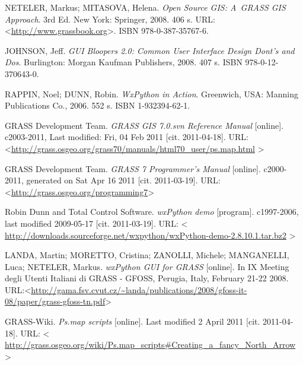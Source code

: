 \documentclass[a4paper,12pt,draft]{article}
\begin{document}
\begin{thebibliography}{99}
\label{literatura}


NETELER, Markus; MITASOVA, Helena. \textit{Open Source GIS:
A~GRASS GIS Approach}. 3rd Ed. New York: Springer, 2008. 406 s. URL:
\textless\url{http://www.grassbook.org}\textgreater. ISBN 978-0-387-35767-6.


JOHNSON, Jeff. \textit{GUI Bloopers 2.0: Common User Interface Design
Dont's and Dos}. Burlington: Morgan Kaufman Publishers, 2008. 407 s. ISBN
978-0-12-370643-0.


RAPPIN, Noel; DUNN, Robin. \emph{WxPython in Action}. Greenwich, USA: Manning
Publications Co., 2006. 552 s. ISBN 1-932394-62-1.


GRASS Development Team. \textit{GRASS GIS 7.0.svn Reference
Manual} [online]. c2003-2011, Last modified: Fri, 04 Feb 2011 [cit.
2011-04-18]. URL:
\textless\url{http://grass.osgeo.org/grass70/manuals/html70_user/ps.map.html}%
\textgreater


GRASS Development Team. \textit{GRASS 7 Programmer's Manual} [online].
c2000-2011, generated on Sat Apr 16 2011 [cit. 2011-03-19].
URL: \textless\url{http://grass.osgeo.org/programming7}\textgreater

Robin Dunn and Total Control Software. \textit{wxPython
demo} [program]. c1997-2006, last modified 2009-05-17 [cit. 2011-03-19]. URL:
\textless
\url{http://downloads.sourceforge.net/wxpython/wxPython-demo-2.8.10.1.tar.bz2}%
\textgreater


LANDA, Martin; MORETTO, Cristina; ZANOLLI, Michele; MANGANELLI, Luca; NETELER, Markus.
\textit{wxPython GUI for GRASS} [online]. In IX Meeting degli Utenti Italiani di GRASS - GFOSS, Perugia, Italy, February 21-22 2008.
URL:\textless\url{http://gama.fsv.cvut.cz/~landa/publications/2008/gfoss-it-08/paper/grass-gfoss-tn.pdf}\textgreater




GRASS-Wiki. \textit{Ps.map scripts} [online]. Last modified
2 April 2011 [cit. 2011-04-18]. URL: \textless
\url{http://grass.osgeo.org/wiki/Ps.map_scripts\#Creating_a_fancy_North_Arrow}
\textgreater


\end{thebibliography}
\end{document}
